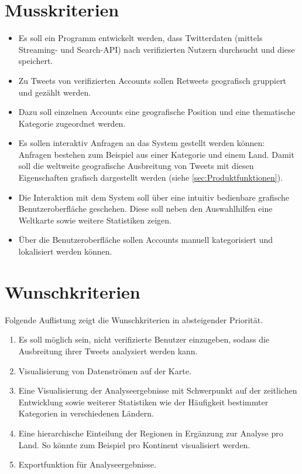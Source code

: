 
\section{Musskriterien}
\begin{itemize}
	\item Es soll ein Programm entwickelt werden, dass Twitterdaten (mittels Streaming- und Search-API) nach verifizierten Nutzern durchsucht und diese speichert.
	\item Zu Tweets von verifizierten Accounts sollen Retweets geografisch gruppiert und gezählt werden.
	\item Dazu soll einzelnen Accounts eine geografische Position und eine thematische Kategorie zugeordnet werden.
	\item Es sollen interaktiv Anfragen an das System gestellt werden können: Anfragen bestehen zum Beispiel aus einer Kategorie und einem Land. Damit soll die weltweite geografische Ausbreitung von Tweets mit diesen Eigenschaften grafisch dargestellt werden (siehe \cref{sec:Produktfunktionen}).
	\item Die Interaktion mit dem System soll über eine intuitiv bedienbare grafische Benutzeroberfläche geschehen. Diese soll neben den Auswahlhilfen eine Weltkarte sowie weitere Statistiken zeigen.
	\item Über die Benutzeroberfläche sollen Accounts manuell kategorisiert und lokalisiert werden können.
\end{itemize}

\section{Wunschkriterien}
Folgende Auflistung zeigt die Wunschkriterien in absteigender Priorität.
\begin{enumerate}
	\item Es soll möglich sein, nicht verifizierte Benutzer einzugeben, sodass die Ausbreitung ihrer Tweets analysiert werden kann.
	\item Visualisierung von Datenströmen auf der Karte.
	\item Eine Visualisierung der Analyseergebnisse mit Schwerpunkt auf der zeitlichen Entwicklung sowie weiterer Statistiken wie der Häufigkeit bestimmter Kategorien in verschiedenen Ländern.
	\item Eine hierarchische Einteilung der Regionen in Ergänzung zur Analyse pro Land. So könnte zum Beispiel pro Kontinent  visualisiert werden.
	\item Exportfunktion für Analyseergebnisse.
\end{enumerate}

